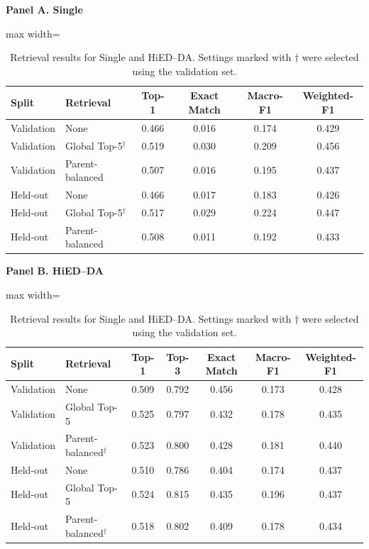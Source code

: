 \documentclass[12pt,a4paper,oneside]{report}
\begin{document}
\begin{table}[H]
\centering
\caption{Retrieval results for Single and HiED--DA. Settings marked with
$\dagger$ were selected using the validation set.}
\label{tab:retrieval-results}
\small

\textbf{Panel A. Single}

\vspace{0.3em}

\begin{adjustbox}{max width=\textwidth}
\begin{tabular}{|l|l|c|c|c|c|}
\hline
\textbf{Split} &
\textbf{Retrieval} &
\textbf{Top-1} &
\textbf{Exact Match} &
\textbf{Macro-F1} &
\textbf{Weighted-F1}\\
\hline
Validation & None & 0.466 & 0.016 & 0.174 & 0.429\\
\hline
Validation & Global Top-5$^{\dagger}$ & 0.519 & 0.030 & 0.209 & 0.456\\
\hline
Validation & Parent-balanced & 0.507 & 0.016 & 0.195 & 0.437\\
\hline
Held-out & None & 0.466 & 0.017 & 0.183 & 0.426\\
\hline
Held-out & Global Top-5$^{\dagger}$ & 0.517 & 0.029 & 0.224 & 0.447\\
\hline
Held-out & Parent-balanced & 0.508 & 0.011 & 0.192 & 0.433\\
\hline
\end{tabular}
\end{adjustbox}

\vspace{0.8em}

\textbf{Panel B. HiED--DA}

\vspace{0.3em}

\begin{adjustbox}{max width=\textwidth}
\begin{tabular}{|l|l|c|c|c|c|c|}
\hline
\textbf{Split} &
\textbf{Retrieval} &
\textbf{Top-1} &
\textbf{Top-3} &
\textbf{Exact Match} &
\textbf{Macro-F1} &
\textbf{Weighted-F1}\\
\hline
Validation & None & 0.509 & 0.792 & 0.456 & 0.173 & 0.428\\
\hline
Validation & Global Top-5 & 0.525 & 0.797 & 0.432 & 0.178 & 0.435\\
\hline
Validation & Parent-balanced$^{\dagger}$ & 0.523 & 0.800 & 0.428 & 0.181 & 0.440\\
\hline
Held-out & None & 0.510 & 0.786 & 0.404 & 0.174 & 0.437\\
\hline
Held-out & Global Top-5 & 0.524 & 0.815 & 0.435 & 0.196 & 0.437\\
\hline
Held-out & Parent-balanced$^{\dagger}$ & 0.518 & 0.802 & 0.409 & 0.178 & 0.434\\
\hline
\end{tabular}
\end{adjustbox}
\end{table}
\end{document}
